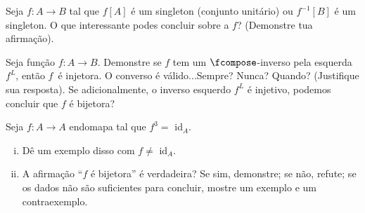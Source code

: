 \begin{exercise}
Seja $f:A \to B$ tal que $f[A]$ é um singleton (conjunto unitário) ou $f^{-1}[B]$ é um singleton. O que interessante podes concluir sobre a $f$? (Demonstre tua afirmação).
\end{exercise}

\begin{exercise}
Seja função $f:A \to B$. Demonstre se $f$ tem um $\fcompose$-inverso pela esquerda $f^L$, então $f$ é injetora. O converso é válido...Sempre? Nunca? Quando? (Justifique sua resposta). Se adicionalmente, o inverso esquerdo $f^L$ é injetivo, podemos concluir que $f$ é bijetora?
\end{exercise}

\begin{exercise}
Seja $f:A \to A$ endomapa tal que $f^3 = $ id$_A$.
\begin{enumerate}[(i)]
    \item Dê um exemplo disso com $f \not = $ id$_A$.
    \item A afirmação ``$f$ é bijetora'' é verdadeira? Se sim, demonstre; se não, refute; se os dados não são suficientes para concluir, mostre um exemplo e um contraexemplo.
\end{enumerate}
\end{exercise}
